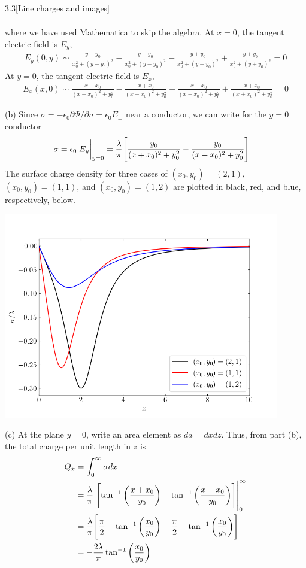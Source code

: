 \documentclass[12pt]{article}
\begin{document}
\begin{problem}{3.3}[Line charges and images]
\begin{solution}
\begin{subequations}
\begin{align}
        \end{align} 
    \end{subequations}
    where we have used Mathematica to skip the algebra. At $x=0$, the tangent electric field is $E_y$,
    \begin{align}
        E_y(0,y)\sim\frac{y-y_0}{x_0^2+(y-y_0)^2}-\frac{y-y_0}{x_0^2+(y-y_0)^2}-\frac{y+y_0}{x_0^2+(y+y_0)^2}+\frac{y+y_0}{x_0^2+(y+y_0)^2}=0
    \end{align}
    At $y=0$, the tangent electric field is $E_x$,
    \begin{align}
        E_x(x,0)\sim\frac{x-x_0}{(x-x_0)^2+y_0^2}-\frac{x+x_0}{(x+x_0)^2+y_0^2}-\frac{x-x_0}{(x-x_0)^2+y_0^2}+\frac{x+x_0}{(x+x_0)^2+y_0^2}=0
    \end{align}

    (b) Since $\sigma=-\epsilon_0\partial\Phi/\partial n=\epsilon_0 E_\perp$
    near a conductor, we can write for the $y=0$ conductor
    \begin{align}
        \sigma&=\epsilon_0\eval{E_y}_{y=0}
        =\frac{\lambda}{\pi}\Bigg[\frac{y_0}{(x+x_0)^2+y_0^2}-\frac{y_0}{(x-x_0)^2+y_0^2}\Bigg]
    \end{align}
    The surface charge density for three cases of $(x_0,y_0)=(2,1)$,
    $(x_0,y_0)=(1,1)$, and $(x_0,y_0)=(1,2)$ are plotted in black, red, and
    blue, respectively, below.
    \begin{center}
        \includegraphics[width=0.9\textwidth]{p3.png} 
    \end{center}

    (c) At the plane $y=0$, write an area element as $da=dx dz$. Thus, from part
    (b), the total charge per unit length in $z$ is
    \begin{align}
        Q_x&=\int_0^\infty \sigma dx \notag\\
           &=\frac{\lambda}{\pi}\eval{\qty[\tan^{-1}\qty(\frac{x+x_0}{y_0})-\tan^{-1}\qty(\frac{x-x_0}{y_0})]}_0^\infty\notag\\
           &=\frac\lambda\pi\qty[\frac{\pi}{2}-\tan^{-1}\qty(\frac{x_0}{y_0})-\frac\pi2-\tan^{-1}\qty(\frac{x_0}{y_0})]\notag\\
           &=-\frac{2\lambda}{\pi}\tan^{-1}\qty(\frac{x_0}{y_0})
    \end{align}


\end{solution}
\end{problem}
\end{document}
